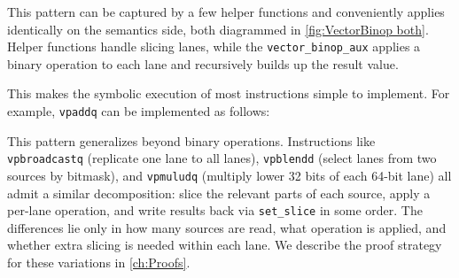 This pattern can be captured by a few helper functions and conveniently applies identically on the semantics side, both diagrammed in \autoref{fig:VectorBinop both}.
Helper functions handle slicing lanes, while the \texttt{vector_binop_aux} applies a binary operation to each lane and recursively builds up the result value.



This makes the symbolic execution of most instructions simple to implement.
For example, \texttt{vpaddq} can be implemented as follows:


This pattern generalizes beyond binary operations.
Instructions like \texttt{vpbroadcastq} (replicate one lane to all lanes), \texttt{vpblendd} (select lanes from two sources by bitmask), and \texttt{vpmuludq} (multiply lower 32 bits of each 64-bit lane) all admit a similar decomposition: slice the relevant parts of each source, apply a per-lane operation, and write results back via \texttt{set\_slice} in some order.
The differences lie only in how many sources are read, what operation is applied, and whether extra slicing is needed within each lane.
We describe the proof strategy for these variations in \autoref{ch:Proofs}.


